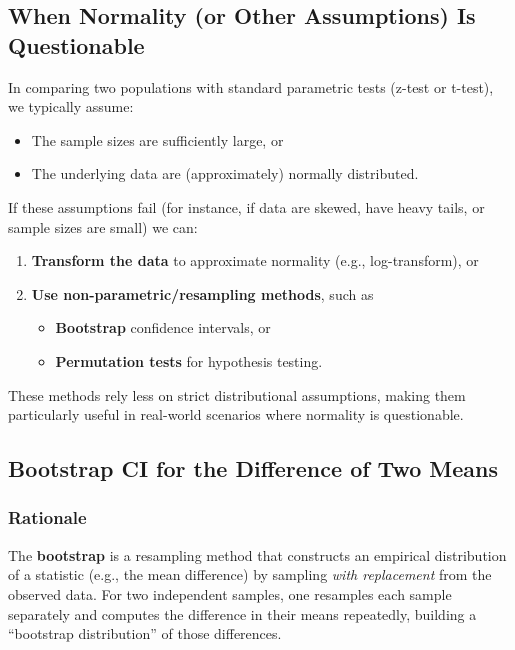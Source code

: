 \documentclass[10pt, total={6in, 8in}]{extarticle}
\begin{document}
\subsection{When Normality (or Other Assumptions) Is Questionable}

In comparing two populations with standard parametric tests (z-test or t-test), we typically assume:
\begin{itemize}
    \item The sample sizes are sufficiently large, or
    \item The underlying data are (approximately) normally distributed.
\end{itemize}
If these assumptions fail (for instance, if data are skewed, have heavy tails, or sample sizes are small) we can:
\begin{enumerate}
    \item \textbf{Transform the data} to approximate normality (e.g., log-transform), or
    \item \textbf{Use non-parametric/resampling methods}, such as
          \begin{itemize}
              \item \textbf{Bootstrap} confidence intervals, or
              \item \textbf{Permutation tests} for hypothesis testing.
          \end{itemize}
\end{enumerate}
These methods rely less on strict distributional assumptions, making them particularly useful in real-world scenarios where normality is questionable.

\subsection{Bootstrap CI for the Difference of Two Means}

\subsubsection{Rationale}
The \textbf{bootstrap} is a resampling method that constructs an empirical distribution of a statistic (e.g., the mean difference) by sampling \emph{with replacement} from the observed data. For two independent samples, one resamples each sample separately and computes the difference in their means repeatedly, building a “bootstrap distribution” of those differences.
\end{document}
